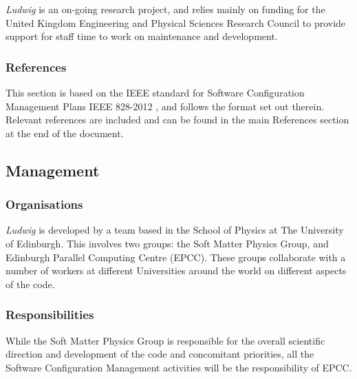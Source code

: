 \textit{Ludwig} is an on-going research project, and relies mainly
on funding for the United Kingdom Engineering and Physical Sciences Research
Council to provide support for staff time to work on maintenance and
development.


\subsubsection{References}

This section is based on the IEEE standard for Software Configuration
Management Plans IEEE 828-2012 \cite{ieee-828-2012}, and follows the format
set out therein.
Relevant references are included and can be found in the main References
section at the end of the document.

\subsection{Management}

\subsubsection{Organisations}

\textit{Ludwig} is developed by a team based in the School of Physics at
The University of Edinburgh. This involves two groups: the Soft Matter
Physics Group, and Edinburgh Parallel Computing Centre (EPCC). These
groups collaborate with a number of workers at different Universities
around the world on different aspects of the code.

\subsubsection{Responsibilities}

While the Soft Matter Physics Group is responsible for the overall
scientific direction and development of the code and concomitant
priorities, all the Software Configuration Management activities will
be the responsibility of EPCC.


